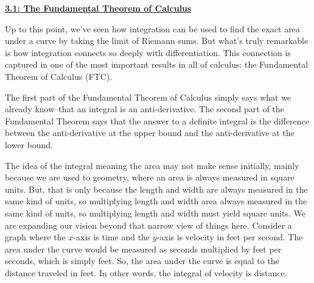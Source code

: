 \textbf{\underline{\large{3.1: The Fundamental Theorem of Calculus}}} \par

Up to this point, we've seen how integration can be used to find the exact area under a curve by taking the limit of Riemann sums. But what's truly remarkable is how integration connects so deeply with differentiation. This connection is captured in one of the most important results in all of calculus: the Fundamental Theorem of Calculus (FTC). \par

\begin{center}
\end{center}

The first part of the Fundamental Theorem of Calculus simply says what we already know--that an integral is an anti-derivative. The second part of the Fundamental Theorem says that the answer to a definite integral is the difference between the anti-derivative at the upper bound and the anti-derivative at the lower bound. \par

The idea of the integral meaning the area may not make sense initially, mainly because we are used to geometry, where an area is always measured in square units. But, that is only because the length and width are always measured in the same kind of units, so multiplying length and width area always measured in the same kind of units, so multiplying length and width must yield square units. We are expanding our vision beyond that narrow view of things here. Consider a graph where the $x$-axis is time and the $y$-axis is velocity in feet per second. The area under the curve would be measured as seconds multiplied by feet per seconds, which is simply feet. So, the area under the curve is equal to the distance traveled in feet. In other words, the integral of velocity is distance. \par

